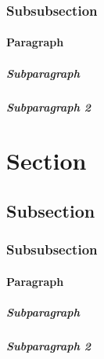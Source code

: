 \subsubsection{Subsubsection}
\paragraph{Paragraph}
\subparagraph{Subparagraph}
\subparagraph{Subparagraph 2}
\newpage

\section{Section}
\lipsum[1]
\subsection{Subsection}
\lipsum[2]
\subsubsection{Subsubsection}
\lipsum[3]
\paragraph{Paragraph}
\lipsum[4]
\subparagraph{Subparagraph}
\lipsum[5]
\subparagraph{Subparagraph 2}
\lipsum[6]
